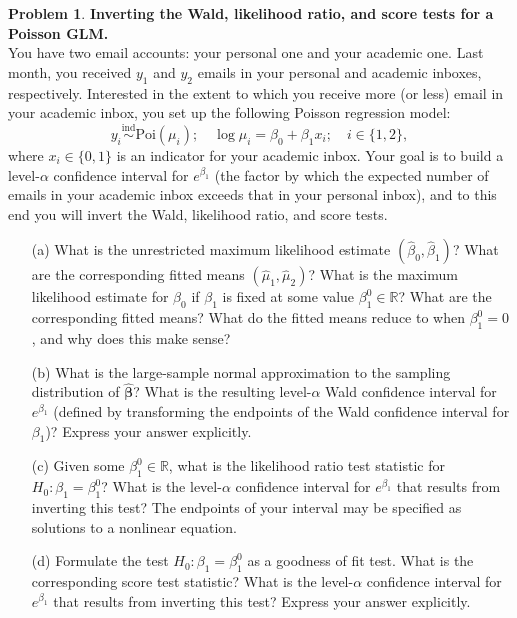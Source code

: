 \documentclass[11pt,letterpaper,english,oneside]{article}\usepackage[]{graphicx}\usepackage[]{color}
\theoremstyle{definition} %
\newtheorem{problem}{Problem}
\newenvironment{prob}{\clearpage \begin{problem}\hspace{0pt}}{\end{problem}}
\begin{document}
\begin{prob} \label{prob:ci-calculation}\textbf{Inverting the Wald, likelihood ratio, and score tests for a Poisson GLM.} \\

\noindent You have two email accounts: your personal one and your academic one. Last month, you received $y_1$ and $y_2$ emails in your personal and academic inboxes, respectively. Interested in the extent to which you receive more (or less) email in your academic inbox, you set up the following Poisson regression model:
\begin{equation*}
y_i \overset{\text{ind}} \sim \text{Poi}(\mu_i); \quad \log \mu_i = \beta_0 + \beta_1 x_i; \quad i \in \{1,2\},
\end{equation*}
where $x_i \in \{0,1\}$ is an indicator for your academic inbox. Your goal is to build a level-$\alpha$ confidence interval for $e^{\beta_1}$ (the factor by which the expected number of emails in your academic inbox exceeds that in your personal inbox), and to this end you will invert the Wald, likelihood ratio, and score tests.

\begin{enumerate}

\item[(a)] What is the unrestricted maximum likelihood estimate $(\widehat \beta_0, \widehat \beta_1)$? What are the corresponding fitted means $(\widehat \mu_1, \widehat \mu_2)$? What is the maximum likelihood estimate for $\beta_0$ if $\beta_1$ is fixed at some value $\beta_1^0 \in \mathbb R$? What are the corresponding fitted means? What do the fitted means reduce to when $\beta_1^0 = 0$, and why does this make sense?

\item[(b)] What is the large-sample normal approximation to the sampling distribution of $\bm{\widehat \beta}$? What is the resulting level-$\alpha$ Wald confidence interval for $e^{\beta_1}$ (defined by transforming the endpoints of the Wald confidence interval for $\beta_1$)? Express your answer explicitly.

\item[(c)] Given some $\beta_1^0 \in \mathbb R$, what is the likelihood ratio test statistic for $H_0: \beta_1 = \beta_1^0$? What is the level-$\alpha$ confidence interval for $e^{\beta_1}$ that results from inverting this test? The endpoints of your interval may be specified as solutions to a nonlinear equation.

\item[(d)] Formulate the test $H_0: \beta_1 = \beta_1^0$ as a goodness of fit test. What is the corresponding score test statistic? What is the level-$\alpha$ confidence interval for $e^{\beta_1}$ that results from inverting this test? Express your answer explicitly.


\end{enumerate}

\end{prob}
\end{document}
